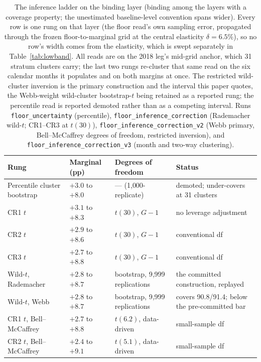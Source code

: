 \documentclass[12pt]{article}
\begin{document}
\begin{table}[!t]
\centering
\caption{The inference ladder on the binding layer (binding among the layers with a coverage property; the unestimated baseline-level convention spans wider). Every row is one rung on that layer (the floor read's own sampling error, propagated through the frozen floor-to-marginal grid at the central elasticity $\delta = 6.5\%$), so no row's width comes from the elasticity, which is swept separately in Table~\ref{tab:lowband}. All reads are on the 2018 leg's mid-grid anchor, which 31 stratum clusters carry; the last two rungs re-cluster that same read on the six calendar months it populates and on both margins at once. The restricted wild-cluster inversion is the primary construction and the interval this paper quotes, the Webb-weight wild-cluster bootstrap-$t$ being retained as a reported rung; the percentile read is reported demoted rather than as a competing interval. Runs \texttt{floor\_uncertainty} (percentile), \texttt{floor\_inference\_correction} (Rademacher wild-$t$; CR1--CR3 at $t(30)$), \texttt{floor\_inference\_correction\_v2} (Webb primary, Bell--McCaffrey degrees of freedom, restricted inversion), and \texttt{floor\_inference\_correction\_v3} (month and two-way clustering).}
\label{tab:ladder}
\footnotesize
\begin{threeparttable}
\begin{tabular}{@{}lp{2.2cm}p{3.3cm}p{4.4cm}@{}}
\toprule
Rung & Marginal (pp) & Degrees of freedom & Status \\
\midrule
Percentile cluster bootstrap & $+3.0$ to $+8.0$ & --- (1{,}000-replicate) & demoted; under-covers at 31 clusters \\
CR1 $t$ & $+3.1$ to $+8.3$ & $t(30)$, $G-1$ & no leverage adjustment \\
CR2 $t$ & $+2.9$ to $+8.6$ & $t(30)$, $G-1$ & conventional df \\
CR3 $t$ & $+2.7$ to $+8.8$ & $t(30)$, $G-1$ & conventional df \\
Wild-$t$, Rademacher & $+2.8$ to $+8.7$ & bootstrap, 9{,}999 replications & the committed construction, replayed \\
Wild-$t$, Webb & $+2.8$ to $+8.7$ & bootstrap, 9{,}999 replications & covers 90.8/91.4; below the pre-committed bar \\
CR1 $t$, Bell--McCaffrey & $+2.7$ to $+8.8$ & $t(6.2)$, data-driven & small-sample df \\
CR2 $t$, Bell--McCaffrey & $+2.4$ to $+9.1$ & $t(5.1)$, data-driven & small-sample df \\

\end{tabular}
\end{threeparttable}
\end{table}
\end{document}
